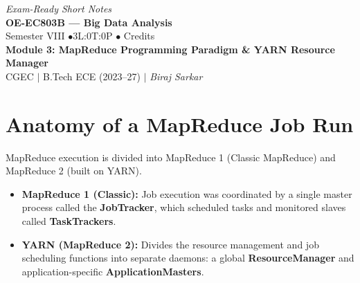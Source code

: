 \documentclass[12pt,a4paper]{article}
\begin{document}
\begin{center}
  \hfill \textit{Exam-Ready Short Notes} \\
  \vspace{6pt}
  {\LARGE\bfseries\color{myred} OE-EC803B --- Big Data Analysis}\\[5pt]
  {\normalsize\color{mydark} Semester VIII \quad$\bullet$\quad 3L:0T:0P \quad$\bullet$ Credits}\\[3pt]
  {\normalsize\color{myteal}\textbf{Module 3: MapReduce Programming Paradigm \& YARN Resource Manager}}\\[3pt]
  {\small\color{mydark} CGEC \;$|$\; B.Tech ECE (2023--27) \;$|$\; \textit{Biraj Sarkar}}
\end{center}
\vspace{2pt}
\noindent{\color{myred}\rule{\linewidth}{1.5pt}}
\vspace{2pt}

\hypersetup{linkcolor=mydark}
\tableofcontents
\hypersetup{linkcolor=myteal}
\newpage

\section{Anatomy of a MapReduce Job Run}

MapReduce execution is divided into MapReduce 1 (Classic MapReduce) and MapReduce 2 (built on YARN).

\begin{tcolorbox}[defbox, title={Classic MapReduce vs. YARN}]
  \begin{itemize}[leftmargin=*, noitemsep]
    \item \textbf{MapReduce 1 (Classic):} Job execution was coordinated by a single master process called the \textbf{JobTracker}, which scheduled tasks and monitored slaves called \textbf{TaskTrackers}.
    \item \textbf{YARN (MapReduce 2):} Divides the resource management and job scheduling functions into separate daemons: a global \textbf{ResourceManager} and application-specific \textbf{ApplicationMasters}.
  \end{itemize}
\end{tcolorbox}
\end{document}

